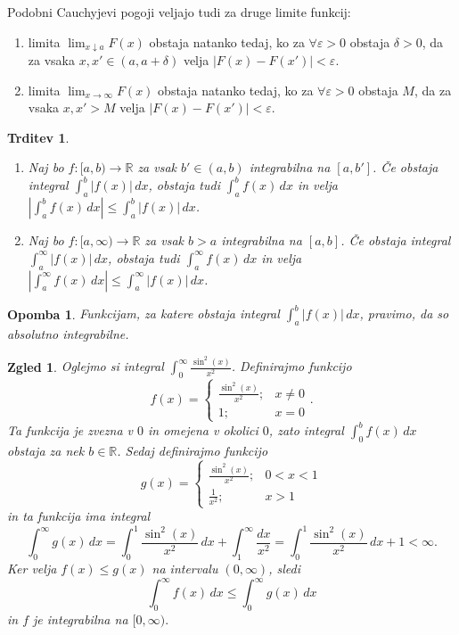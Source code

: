 \documentclass[10pt, a4paper]{article}
\newtheorem{trditev}[izr]{Trditev}
\newtheorem*{opomba}{Opomba}
\newtheorem{zgled}{Zgled}[section]
\newcommand{\R}{\mathbb {R}}
\newcommand{\limf}[3]{\lim_{#1 \to #2} {#3}}
\newcommand{\rlimf}[3]{\lim_{#1 \downarrow #2} {#3}}
\begin{document}
Podobni Cauchyjevi pogoji veljajo tudi za druge limite funkcij:
\begin{enumerate}
    \item limita $\rlimf{x}{a}{F(x)}$ obstaja natanko tedaj, ko za $\forall \varepsilon > 0$ obstaja $\delta > 0$, da za vsaka $x, x' \in (a, a + \delta)$ velja $|F(x) - F(x')| < \varepsilon$.
    \item limita $\limf{x}{\infty}{F(x)}$ obstaja natanko tedaj, ko za $\forall \varepsilon > 0$ obstaja $M$, da za vsaka $x, x' > M$ velja $|F(x) - F(x')| < \varepsilon$.
\end{enumerate}

\begin{trditev}
    \begin{enumerate}
        \item Naj bo $f: [a, b) \rightarrow \R$ za vsak $b' \in (a, b)$ integrabilna na $[a, b']$.
        Če obstaja integral $\int_a ^b |f(x)|\,dx$, obstaja tudi $\int_a ^b f(x)\,dx$ in velja $\left| \int_a ^b f(x)\,dx \right| \leq \int_a ^b |f(x)|\,dx$.
        \item Naj bo $f: [a, \infty) \rightarrow \R$ za vsak $b > a$ integrabilna na $[a, b]$.
        Če obstaja integral $\int_a ^{\infty} |f(x)|\,dx$, obstaja tudi $\int_a ^{\infty} f(x)\,dx$ in velja $\left| \int_a ^{\infty} f(x)\,dx \right| \leq \int_a ^{\infty} |f(x)|\,dx$.
    \end{enumerate}
\end{trditev}

\begin{opomba}
    Funkcijam, za katere obstaja integral $\int_a ^b |f(x)|\,dx$, pravimo, da so absolutno integrabilne.
\end{opomba}

\begin{zgled}
        Oglejmo si integral $\int_0 ^\infty \frac{\sin ^2 (x)}{x^2}$. 
        Definirajmo funkcijo $$f(x) = \begin{cases}
            \frac{\sin ^2 (x)}{x^2} ;& x \neq 0\\
            1 ;& x= 0
        \end{cases}.$$
        Ta funkcija je zvezna v $0$ in omejena v okolici $0$, zato integral $\int _0 ^b f(x)\,dx$ obstaja za nek $b \in \R$.
        Sedaj definirajmo funkcijo 
        $$g(x) = \begin{cases}
            \frac{\sin ^2 (x)}{x^2} ;& 0 < x < 1\\
            \frac{1}{x^2} ;& x > 1
        \end{cases}$$ in ta funkcija ima integral $$\int_0 ^\infty g(x)\,dx = \int_0 ^1 \frac{\sin ^2 (x)}{x^2}\,dx + \int_1 ^\infty \frac{dx}{x^2} = \int_0 ^1 \frac{\sin ^2 (x)}{x^2}\,dx + 1 < \infty.$$ 
        Ker velja $f(x) \leq g(x)$ na intervalu $(0, \infty)$, sledi 
        $$\int_0 ^\infty f(x)\,dx \leq \int_0 ^\infty g(x)\,dx$$ in $f$ je integrabilna na $[0, \infty).$
\end{zgled}
\end{document}
